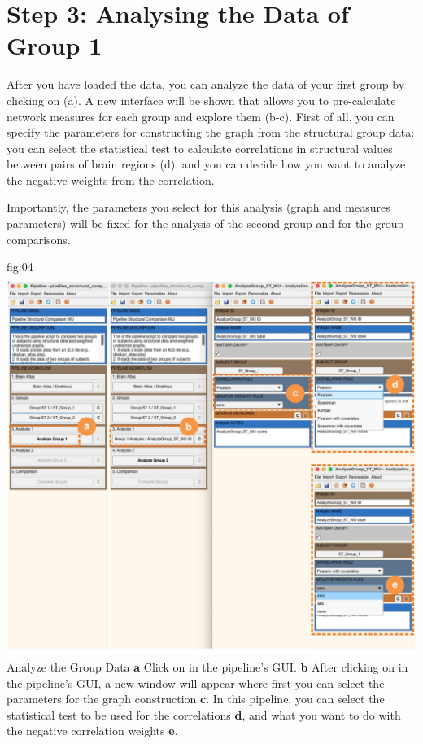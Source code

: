 \documentclass[justified]{tufte-handout}
\begin{document}
\section{Step 3: Analysing the Data of Group 1}
 
After you have loaded the data, you can analyze the data of your first group by clicking on  (a). A new interface will be shown that allows you to pre-calculate network measures for each group and explore them (b-c). First of all, you can specify the parameters for constructing the graph from the structural group data: you can select the statistical test to calculate correlations in structural values between pairs of brain regions (d), and you can decide how you want to analyze the negative weights from the correlation. 

Importantly, the parameters you select for this analysis (graph and measures parameters) will be fixed for the analysis of the second group and for the group comparisons.

	{fig:04}
	{
	\includegraphics{fig04.jpg}
	}
	{Analyze the Group Data}
	{
	{\bf a} Click on  in the pipeline's GUI.
        {\bf b} After clicking on  in the pipeline's GUI, a new window will appear where first you can select the parameters for the graph construction {\bf c}. In this pipeline, you can select the statistical test to be used for the correlations {\bf d}, and what you want to do with the negative correlation weights {\bf e}.
	}
\end{document}
